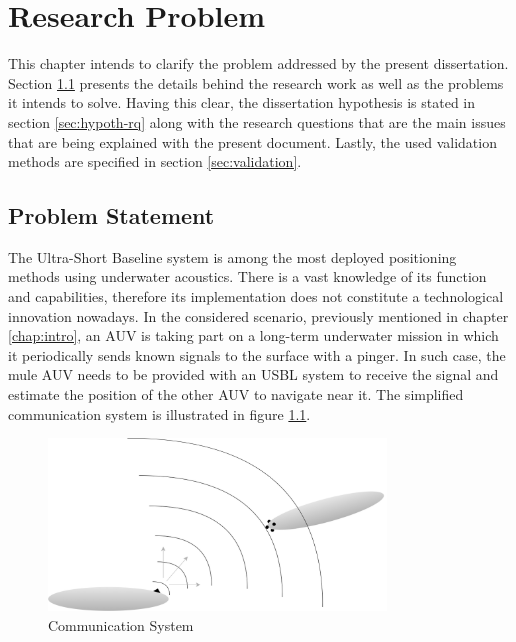 \chapter{Research Problem} \label{chap:problem}

This chapter intends to clarify the problem addressed by the present dissertation. Section \ref{sec:prob-state} presents the details behind the research work as well as the problems it intends to solve. Having this clear, the dissertation hypothesis is stated in section \ref{sec:hypoth-rq} along with the research questions that are the main issues that are being explained with the present document. Lastly, the used validation methods are specified in section \ref{sec:validation}.

\section{Problem Statement} \label{sec:prob-state}

The Ultra-Short Baseline system is among the most deployed positioning methods using underwater acoustics. There is a vast knowledge of its function and capabilities, therefore its implementation does not constitute a technological innovation nowadays. 
In the considered scenario, previously mentioned in chapter \ref{chap:intro}, an AUV is taking part on a long-term underwater mission in which it periodically sends known signals to the surface with a pinger. In such case, the mule AUV needs to be provided with an USBL system to receive the signal and estimate the position of the other AUV to navigate near it. The simplified communication system is illustrated in figure \ref{fig:auv_scene}. 


\begin{figure}[!htbp]
	\centering
	\includegraphics[width=0.8\textwidth]{figures/proposed-solution}
	\caption{Communication System}
	\label{fig:auv_scene}
\end{figure}

